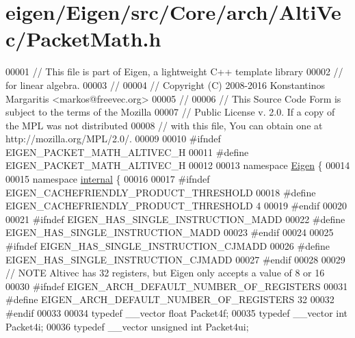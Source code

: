 \hypertarget{eigen_2_eigen_2src_2_core_2arch_2_alti_vec_2_packet_math_8h_source}{}\section{eigen/\+Eigen/src/\+Core/arch/\+Alti\+Vec/\+Packet\+Math.h}
\label{eigen_2_eigen_2src_2_core_2arch_2_alti_vec_2_packet_math_8h_source}

\begin{DoxyCode}
00001 \textcolor{comment}{// This file is part of Eigen, a lightweight C++ template library}
00002 \textcolor{comment}{// for linear algebra.}
00003 \textcolor{comment}{//}
00004 \textcolor{comment}{// Copyright (C) 2008-2016 Konstantinos Margaritis <markos@freevec.org>}
00005 \textcolor{comment}{//}
00006 \textcolor{comment}{// This Source Code Form is subject to the terms of the Mozilla}
00007 \textcolor{comment}{// Public License v. 2.0. If a copy of the MPL was not distributed}
00008 \textcolor{comment}{// with this file, You can obtain one at http://mozilla.org/MPL/2.0/.}
00009 
00010 \textcolor{preprocessor}{#ifndef EIGEN\_PACKET\_MATH\_ALTIVEC\_H}
00011 \textcolor{preprocessor}{#define EIGEN\_PACKET\_MATH\_ALTIVEC\_H}
00012 
00013 \textcolor{keyword}{namespace }\hyperlink{namespace_eigen}{Eigen} \{
00014 
00015 \textcolor{keyword}{namespace }\hyperlink{namespaceinternal}{internal} \{
00016 
00017 \textcolor{preprocessor}{#ifndef EIGEN\_CACHEFRIENDLY\_PRODUCT\_THRESHOLD}
00018 \textcolor{preprocessor}{#define EIGEN\_CACHEFRIENDLY\_PRODUCT\_THRESHOLD 4}
00019 \textcolor{preprocessor}{#endif}
00020 
00021 \textcolor{preprocessor}{#ifndef EIGEN\_HAS\_SINGLE\_INSTRUCTION\_MADD}
00022 \textcolor{preprocessor}{#define EIGEN\_HAS\_SINGLE\_INSTRUCTION\_MADD}
00023 \textcolor{preprocessor}{#endif}
00024 
00025 \textcolor{preprocessor}{#ifndef EIGEN\_HAS\_SINGLE\_INSTRUCTION\_CJMADD}
00026 \textcolor{preprocessor}{#define EIGEN\_HAS\_SINGLE\_INSTRUCTION\_CJMADD}
00027 \textcolor{preprocessor}{#endif}
00028 
00029 \textcolor{comment}{// NOTE Altivec has 32 registers, but Eigen only accepts a value of 8 or 16}
00030 \textcolor{preprocessor}{#ifndef EIGEN\_ARCH\_DEFAULT\_NUMBER\_OF\_REGISTERS}
00031 \textcolor{preprocessor}{#define EIGEN\_ARCH\_DEFAULT\_NUMBER\_OF\_REGISTERS  32}
00032 \textcolor{preprocessor}{#endif}
00033 
00034 \textcolor{keyword}{typedef} \_\_vector \textcolor{keywordtype}{float}          Packet4f;
00035 \textcolor{keyword}{typedef} \_\_vector \textcolor{keywordtype}{int}            Packet4i;
00036 \textcolor{keyword}{typedef} \_\_vector \textcolor{keywordtype}{unsigned} \textcolor{keywordtype}{int}   Packet4ui;

\end{DoxyCode}
